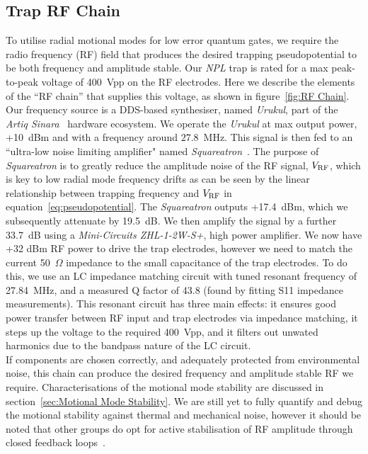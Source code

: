 \subsection{Trap RF Chain}
\label{sec:Trap RF Chain}
    To utilise radial motional modes for low error quantum gates, we require the
    radio frequency (RF) field that produces the desired trapping
    pseudopotential to be both frequency and amplitude stable. Our \emph{NPL}
    trap is rated for a max peak-to-peak voltage of 400~Vpp on the RF
    electrodes. Here we describe the elements of the ``RF chain'' that supplies
    this voltage, as shown in figure~\ref{fig:RF Chain}. \\
    Our frequency source is a DDS-based synthesiser, named \emph{Urukul}, part
    of the \emph{Artiq Sinara}~\cite{XXX} hardware ecosystem. We operate the
    \emph{Urukul} at max output power, +10~dBm and with a frequency around $27.8$~MHz. This
    signal is then fed to an ``ultra-low noise limiting amplifier" named
    \emph{Squareatron}~\cite{XXX}. The purpose of \emph{Squareatron} is to
    greatly reduce the amplitude noise of the RF signal, $V_{\rm RF}$, which is
    key to low radial mode frequency drifts as can be seen by the linear
    relationship between trapping frequency and $V_{\rm RF}$ in
    equation~\ref{eq:pseudopotential}. The \emph{Squareatron} outputs +17.4~dBm,
    which we subsequently attenuate by 19.5~dB. We then amplify the signal by a
    further 33.7~dB using a \emph{Mini-Circuits ZHL-1-2W-S+}, high power
    amplifier. We now have +32 dBm RF power to drive the trap
    electrodes, however we need to match the current 50~$\Omega$ impedance to
    the small capacitance of the trap electrodes. To do this, we use an LC
    impedance matching circuit with tuned resonant frequency of 27.84~MHz, and a
    measured Q factor of 43.8 (found by fitting S11 impedance measurements).
    This resonant circuit has three main effects: it ensures good power transfer
    between RF input and trap electrodes via impedance matching, it steps up the
    voltage to the required 400~Vpp, and it filters out unwated harmonics due to
    the bandpass nature of the LC circuit. \\
    If components are chosen correctly, and adequately protected from
    environmental noise, this chain can produce the desired frequency and
    amplitude stable RF we require. Characterisations of the motional mode
    stability are discussed in section~\ref{sec:Motional Mode Stability}. We are
    still yet to fully quantify and debug the motional stability against thermal
    and mechanical noise, however it should be noted that other groups do opt
    for active stabilisation of RF amplitude through closed feedback loops~\cite{XXX}.\\


